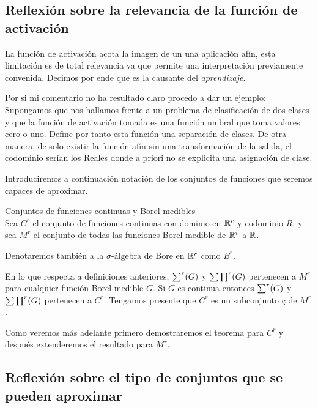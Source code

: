 \subsection{ Reflexión sobre la relevancia de la función de activación}  

La función de activación acota la imagen de un una aplicación afín, esta limitación 
es de total relevancia ya que permite una interpretación previamente convenida. 
Decimos por ende que es la causante del \textit{aprendizaje}.     

Por si mi comentario no ha resultado claro procedo a dar un ejemplo:   
Supongamos que nos hallamos frente a un problema de clasificación de dos clases y que la función de activación
tomada es una función umbral que toma valores cero o uno. Define por tanto esta función una separación de clases. 
De otra manera, de solo existir la función afín sin una transformación de la salida, el codominio serían los Reales
donde a priori no se explicita una asignación de clase.  

Introduciremos a continuación notación de los conjuntos de funciones que seremos capaces de aproximar.  

\begin{definicion} Conjuntos de funciones continuas y Borel-medibles \\
    Sea $C^r$ el conjunto de funciones continuas con dominio en $\mathbb{R}^r$ y codominio $R$, 
    y sea $M^r$ el conjunto de todas las funciones Borel medible de $\mathbb{R}^r$ a $\mathbb{R}$. 

    Denotaremos también a la $\sigma$-álgebra de Bore en $\mathbb{R} ^r$ como $B^r$. 
\end{definicion}

En lo que respecta a definiciones anteriores, $\sum ^r (G)$ y $\sum \prod^r (G)$ pertenecen a 
$M^r$ para cualquier función Borel-medible $G$. Si $G$ es continua entonces 
$\sum ^r (G)$ y $\sum \prod^r (G)$ pertenecen a $C^r$. Tengamos presente que $C^r$ es un subconjunto ç
de $M^r$.  

Como veremos más adelante primero demostraremos el teorema para $C^r$ y después 
extenderemos el resultado para $M^r$.   


\subsection{ Reflexión sobre el tipo de conjuntos que se pueden aproximar}